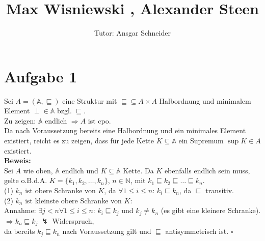 \documentclass[11pt,a4paper,ngerman]{article}
\author{Tutor: Ansgar Schneider}
\date{}
\title{Max Wisniewski , Alexander Steen}
\begin{document}

\maketitle
\thispagestyle{fancy}
\newcommand{\A}{\mathbb{A}}


\section*{Aufgabe 1} Sei $A = (\A, \sqsubseteq)$ eine Struktur mit $\sqsubseteq \subseteq A \times A$ Halbordnung und minimalem Element $\perp \in \mathbb{A}$ bzgl. $\sqsubseteq$. \\
Zu zeigen: $\A$ endlich $\Rightarrow A$ ist cpo. \\

Da nach Voraussetzung bereits eine Halbordnung und ein minimales Element existiert, reicht es zu zeigen, dass für jede Kette $K \subseteq \A$ ein Supremum $\sup K \in A$ existiert. \\
\textbf{Beweis:}\\
Sei $A$ wie oben, $\A$ endlich und $K \subseteq \A$ Kette. Da $K$ ebenfalls endlich sein muss, gelte o.B.d.A. $K = \{ k_1, k_2, \ldots, k_n \}$, $n \in \mathbb{N}$, mit $k_1 \sqsubseteq k_2 \sqsubseteq \ldots \sqsubseteq k_n$. \\

(1) $k_n$ ist obere Schranke von $K$, da $\forall 1 \leq i \leq n: \, k_i \sqsubseteq k_n$, da $\sqsubseteq$ transitiv. \\
(2) $k_n$ ist kleinste obere Schranke von $K$: \\
Annahme: $\exists j < n \forall 1 \leq i \leq n: \, k_i \sqsubseteq k_j$ und $k_j \neq k_n$ (es gibt eine kleinere Schranke). \\
$\Rightarrow k_n \sqsubseteq k_j \; \lightning$ Widerspruch,\\
da bereits $k_j \sqsubseteq k_n$ nach Voraussetzung gilt und $\sqsubseteq$ antisymmetrisch ist.
\mbox{} \hfill $\square$
\end{document}
